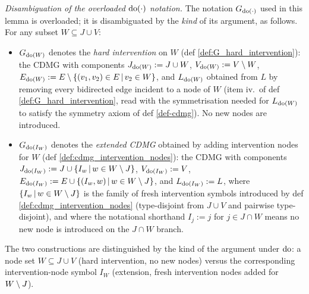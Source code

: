 \documentclass[main]{subfiles}
\begin{document}
\begin{Lem}
    \emph{Disambiguation of the overloaded $\operatorname{do}(\cdot)$ notation.}
    The notation $G_{\operatorname{do}(\cdot)}$ used in this lemma is overloaded; it is disambiguated by the \emph{kind} of its argument, as follows. For any subset $W \subseteq J \cup V$:
    \begin{itemize}
        \item $G_{\operatorname{do}(W)}$ denotes the \emph{hard intervention} on $W$ (def \ref{def:G_hard_intervention}): the CDMG with components $J_{\operatorname{do}(W)} := J \cup W$, $V_{\operatorname{do}(W)} := V \setminus W$, $E_{\operatorname{do}(W)} := E \setminus \left \{ (v_1, v_2) \in E \,\middle|\, v_2 \in W \right \}$, and $L_{\operatorname{do}(W)}$ obtained from $L$ by removing every bidirected edge incident to a node of $W$ (item iv.\ of def \ref{def:G_hard_intervention}, read with the symmetrisation needed for $L_{\operatorname{do}(W)}$ to satisfy the symmetry axiom of def \ref{def-cdmg}). No new nodes are introduced.
        \item $G_{\operatorname{do}(I_W)}$ denotes the \emph{extended CDMG} obtained by adding intervention nodes for $W$ (def \ref{def:cdmg_intervention_nodes}): the CDMG with components $J_{\operatorname{do}(I_W)} := J \cup \left \{ I_w \,\middle|\, w \in W \setminus J \right \}$, $V_{\operatorname{do}(I_W)} := V$, $E_{\operatorname{do}(I_W)} := E \cup \left \{ (I_w, w) \,\middle|\, w \in W \setminus J \right \}$, and $L_{\operatorname{do}(I_W)} := L$, where $\left \{ I_w \,\middle|\, w \in W \setminus J \right \}$ is the family of fresh intervention symbols introduced by def \ref{def:cdmg_intervention_nodes} (type-disjoint from $J \cup V$ and pairwise type-disjoint), and where the notational shorthand $I_j := j$ for $j \in J \cap W$ means no new node is introduced on the $J \cap W$ branch.
    \end{itemize}
    The two constructions are distinguished by the kind of the argument under $\operatorname{do}$: a node set $W \subseteq J \cup V$ (hard intervention, no new nodes) versus the corresponding intervention-node symbol $I_W$ (extension, fresh intervention nodes added for $W \setminus J$).


\end{Lem}
\end{document}
